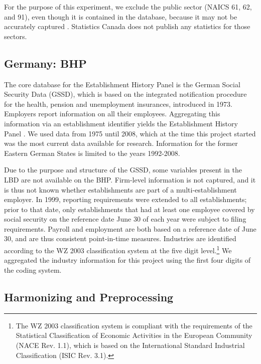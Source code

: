 \documentclass[10pt,twoside]{article}
\begin{document}
For the purpose of this experiment,  we exclude the public sector (NAICS 61, 62, and 91), even though it is contained in the database, because it may not be accurately captured \citep{StatisticsCanada2019}. Statistics Canada does not publish any statistics for those sectors. 
\subsection{Germany: \acf{BHP}}



The core database for the Establishment History Panel is the German Social Security Data  (GSSD), which is based on the integrated notification procedure for the health, pension and unemployment insurances,   introduced in  1973. Employers report information on all their employees. Aggregating this information via an establishment identifier yields the Establishment History Panel \citep[German abbreviation: BHP]{BHP}. We used data from  1975 until 2008, which at the time this project started was the most current data available for research. Information for the former Eastern German States is limited to the years 1992-2008. 

Due to the purpose and structure of the GSSD, some variables present in the \ac{LBD} are not available on the  \ac{BHP}. Firm-level information is not captured, and it is thus not known whether establishments are part of a multi-establishment employer. In 1999, reporting requirements were extended to all establishments; prior to that date, only establishments that  had at least one employee covered by social security on the reference date June 30 of each year were subject to filing requirements. Payroll and employment are both based on a reference date of June 30, and are thus consistent point-in-time measures. 
Industries are identified according to the WZ 2003 classification system \citep{WZ2003} at the five digit level.\footnote{The WZ 2003 classification system is compliant with the requirements of the Statistical Classification of Economic Activities in the European Community (NACE Rev. 1.1), which is based on the International Standard Industrial Classification (ISIC Rev. 3.1).} We aggregated the industry information for this project  using the first four digits of the coding system.




 
\subsection{Harmonizing and Preprocessing}
\end{document}
